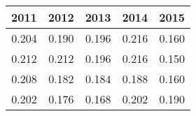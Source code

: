 \begin{tabular}{rrrrr}
\toprule
2011 & 2012 & 2013 & 2014 & 2015 \\
\midrule
0.204 & 0.190 & 0.196 & 0.216 & 0.160 \\
0.212 & 0.212 & 0.196 & 0.216 & 0.150 \\
0.208 & 0.182 & 0.184 & 0.188 & 0.160 \\
0.202 & 0.176 & 0.168 & 0.202 & 0.190 \\
\bottomrule
\end{tabular}

